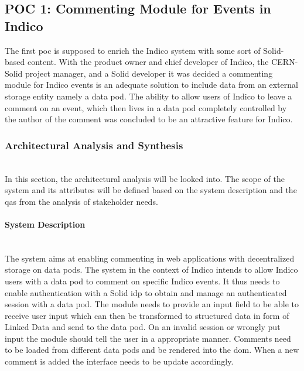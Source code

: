 \subsection{POC 1: Commenting Module for Events in Indico}\label{poc1}

The first \gls{poc} is supposed to enrich the Indico system with some sort of Solid-based content. With the product owner and chief developer of Indico, the CERN-Solid project manager, and a Solid developer it was decided a commenting module for Indico events is an adequate solution to include data from an external storage entity namely a data pod. The ability to allow users of Indico to leave a comment on an event, which then lives in a data pod completely controlled by the author of the comment was concluded to be an attractive feature for Indico.

\subsubsection{Architectural Analysis and Synthesis}\mbox{}\\

In this section, the architectural analysis will be looked into. The scope of the system and its attributes will be defined based on the system description and the \glspl{qa} from the analysis of stakeholder needs.



\vspace{0.5cm}
\paragraph{System Description}\mbox{}\\

The system aims at enabling commenting in web applications with decentralized storage on data pods. The system in the context of Indico intends to allow Indico users with a data pod to comment on specific Indico events. It thus needs to enable authentication with a Solid \gls{idp} to obtain and manage an authenticated session with a data pod. The module needs to provide an input field to be able to receive user input which can then be transformed to structured data in form of Linked Data and send to the data pod. On an invalid session or wrongly put input the module should tell the user in a appropriate manner. Comments need to be loaded from different data pods and be rendered into the \gls{dom}. When a new comment is added the interface needs to be update accordingly.
\vspace{0.5cm}
